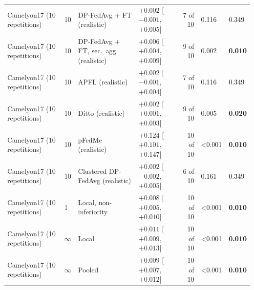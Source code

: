 \begin{tabular}{llllrll}
Camelyon17 (10 repetitions) & 10 & DP-FedAvg + FT \cite{mcmahan2018learning} (realistic) & $+0.002$ [$-0.001$, $+0.005$] & 7 of 10 & 0.116 & 0.349 \\
Camelyon17 (10 repetitions) & 10 & DP-FedAvg + FT, sec.\ agg. \cite{mcmahan2018learning,bonawitz2017practical} (realistic) & $+0.006$ [$+0.004$, $+0.009$] & 9 of 10 & 0.002 & \textbf{0.010} \\
Camelyon17 (10 repetitions) & 10 & APFL \cite{deng2020adaptive} (realistic) & $+0.002$ [$-0.001$, $+0.004$] & 7 of 10 & 0.116 & 0.349 \\
Camelyon17 (10 repetitions) & 10 & Ditto \cite{li2021ditto} (realistic) & $+0.002$ [$+0.001$, $+0.003$] & 9 of 10 & 0.005 & \textbf{0.020} \\
Camelyon17 (10 repetitions) & 10 & pFedMe \cite{tdinh2020personalized} (realistic) & $+0.124$ [$+0.101$, $+0.147$] & 10 of 10 & <0.001 & \textbf{0.010} \\
Camelyon17 (10 repetitions) & 10 & Clustered DP-FedAvg \cite{ghosh2020efficient,mcmahan2018learning} (realistic) & $+0.002$ [$-0.002$, $+0.005$] & 6 of 10 & 0.161 & 0.349 \\
Camelyon17 (10 repetitions) & 1 & Local, non-inferiority & $+0.008$ [$+0.005$, $+0.010$] & 10 of 10 & <0.001 & \textbf{0.010} \\
Camelyon17 (10 repetitions) & $\infty$ & Local & $+0.011$ [$+0.009$, $+0.013$] & 10 of 10 & <0.001 & \textbf{0.010} \\
Camelyon17 (10 repetitions) & $\infty$ & Pooled & $+0.009$ [$+0.007$, $+0.012$] & 10 of 10 & <0.001 & \textbf{0.010} \\
\bottomrule
\end{tabular}
